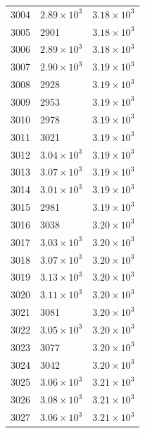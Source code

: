 \begin{table}[H]
\begin{tabular}{lll}
3004 & $\displaystyle 2.89 \times 10^{3}$ & $\displaystyle 3.18 \times 10^{3}$ \\
3005 & 2901 & $\displaystyle 3.18 \times 10^{3}$ \\
3006 & $\displaystyle 2.89 \times 10^{3}$ & $\displaystyle 3.18 \times 10^{3}$ \\
3007 & $\displaystyle 2.90 \times 10^{3}$ & $\displaystyle 3.19 \times 10^{3}$ \\
3008 & 2928 & $\displaystyle 3.19 \times 10^{3}$ \\
3009 & 2953 & $\displaystyle 3.19 \times 10^{3}$ \\
3010 & 2978 & $\displaystyle 3.19 \times 10^{3}$ \\
3011 & 3021 & $\displaystyle 3.19 \times 10^{3}$ \\
3012 & $\displaystyle 3.04 \times 10^{3}$ & $\displaystyle 3.19 \times 10^{3}$ \\
3013 & $\displaystyle 3.07 \times 10^{3}$ & $\displaystyle 3.19 \times 10^{3}$ \\
3014 & $\displaystyle 3.01 \times 10^{3}$ & $\displaystyle 3.19 \times 10^{3}$ \\
3015 & 2981 & $\displaystyle 3.19 \times 10^{3}$ \\
3016 & 3038 & $\displaystyle 3.20 \times 10^{3}$ \\
3017 & $\displaystyle 3.03 \times 10^{3}$ & $\displaystyle 3.20 \times 10^{3}$ \\
3018 & $\displaystyle 3.07 \times 10^{3}$ & $\displaystyle 3.20 \times 10^{3}$ \\
3019 & $\displaystyle 3.13 \times 10^{3}$ & $\displaystyle 3.20 \times 10^{3}$ \\
3020 & $\displaystyle 3.11 \times 10^{3}$ & $\displaystyle 3.20 \times 10^{3}$ \\
3021 & 3081 & $\displaystyle 3.20 \times 10^{3}$ \\
3022 & $\displaystyle 3.05 \times 10^{3}$ & $\displaystyle 3.20 \times 10^{3}$ \\
3023 & 3077 & $\displaystyle 3.20 \times 10^{3}$ \\
3024 & 3042 & $\displaystyle 3.20 \times 10^{3}$ \\
3025 & $\displaystyle 3.06 \times 10^{3}$ & $\displaystyle 3.21 \times 10^{3}$ \\
3026 & $\displaystyle 3.08 \times 10^{3}$ & $\displaystyle 3.21 \times 10^{3}$ \\
3027 & $\displaystyle 3.06 \times 10^{3}$ & $\displaystyle 3.21 \times 10^{3}$ \\

\end{tabular}
\end{table}

